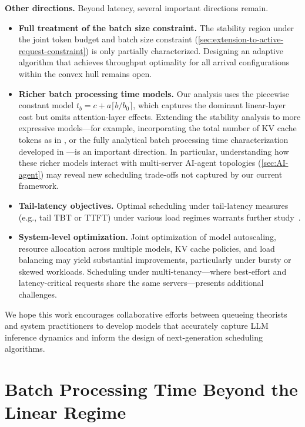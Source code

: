 \documentclass[11pt]{article}
\theoremstyle{plain}
\theoremstyle{definition}
\theoremstyle{remark}
\begin{document}
\textbf{Other directions.}
Beyond latency, several important directions remain.
\begin{itemize}
    \item \textbf{Full treatment of the batch size constraint.} The stability region under the joint token budget and batch size constraint (\cref{sec:extension-to-active-request-constraint}) is only partially characterized. Designing an adaptive algorithm that achieves throughput optimality for all arrival configurations within the convex hull remains open.
    \item \textbf{Richer batch processing time models.} Our analysis uses the piecewise constant model $t_b = c + a\lceil b/b_0\rceil$, which captures the dominant linear-layer cost but omits attention-layer effects. Extending the stability analysis to more expressive models---for example, incorporating the total number of KV cache tokens as in \cite{ao2025optimizing}, or the fully analytical batch processing time characterization developed in \cite{bari2025optimal}---is an important direction. In particular, understanding how these richer models interact with multi-server AI-agent topologies (\cref{sec:AI-agent}) may reveal new scheduling trade-offs not captured by our current framework.
    \item \textbf{Tail-latency objectives.} Optimal scheduling under tail-latency measures (e.g., tail TBT or TTFT) under various load regimes warrants further study~\citep{yu2024strongly,zhang2025tail}.
    \item \textbf{System-level optimization.} Joint optimization of model autoscaling, resource allocation across multiple models, KV cache policies, and load balancing may yield substantial improvements, particularly under bursty or skewed workloads. Scheduling under multi-tenancy---where best-effort and latency-critical requests share the same servers---presents additional challenges.
\end{itemize}
We hope this work encourages collaborative efforts between queueing theorists and system practitioners to develop models that accurately capture LLM inference dynamics and inform the design of next-generation scheduling algorithms.











\appendix

\section{Batch Processing Time Beyond the Linear Regime} \label{sec:discussions}
\end{document}
